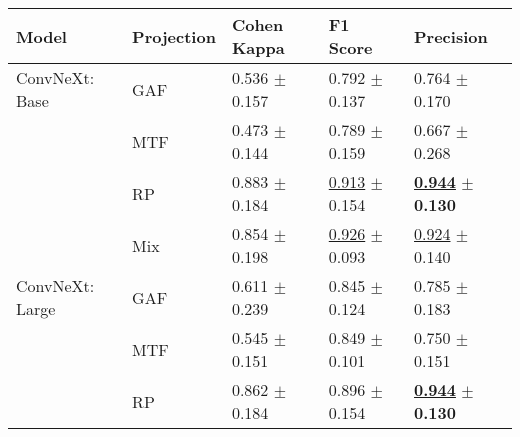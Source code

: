 
\begin{tabular}[t]{lllll}
\toprule
Model & Projection & Cohen Kappa & F1 Score & Precision \\
\midrule
ConvNeXt: Base & GAF & \textcolor[rgb]{0.8501939719,0.1498060281,0}{0.536} $\pm$ \textcolor[rgb]{0.4498340830,0.5000000000,0}{0.157} & \textcolor[rgb]{0.9819518717,0.0180481283,0}{0.792} $\pm$ \textcolor[rgb]{0.6916472560,0.3083527440,0}{0.137} & \textcolor[rgb]{0.6500000000,0.3500000000,0}{0.764} $\pm$ \textcolor[rgb]{0.2890812278,0.5000000000,0}{0.170} \\
 & MTF & \textcolor[rgb]{1.0000000000,0.0000000000,0}{0.473} $\pm$ \textcolor[rgb]{0.3758318907,0.5000000000,0}{0.144} & \textcolor[rgb]{1.0000000000,0.0000000000,0}{0.789} $\pm$ \textcolor[rgb]{1.0000000000,0.0000000000,0}{0.159} & \textcolor[rgb]{1.0000000000,0.0000000000,0}{0.667} $\pm$ \textcolor[rgb]{1.0000000000,0.0000000000,0}{0.268} \\
 & RP & \textcolor[rgb]{0.0295434199,0.5000000000,0}{0.883} $\pm$ \textcolor[rgb]{0.5955244630,0.4044755370,0}{0.184} & \underline{\textcolor[rgb]{0.2319518717,0.5000000000,0}{0.913}} $\pm$ \textcolor[rgb]{0.9235235198,0.0764764802,0}{0.154} & \underline{\textbf{\textcolor[rgb]{0.0000000000,0.5000000000,0}{0.944}}} $\pm$ \textbf{\textcolor[rgb]{0.0000000000,0.5000000000,0}{0.130}} \\
 & Mix & \textcolor[rgb]{0.0984780662,0.5000000000,0}{0.854} $\pm$ \textcolor[rgb]{0.6747481909,0.3252518091,0}{0.198} & \underline{\textcolor[rgb]{0.1510695187,0.5000000000,0}{0.926}} $\pm$ \textcolor[rgb]{0.0999682822,0.5000000000,0}{0.093} & \underline{\textcolor[rgb]{0.0750000000,0.5000000000,0}{0.924}} $\pm$ \textcolor[rgb]{0.0718829596,0.5000000000,0}{0.140} \\
ConvNeXt: Large & GAF & \textcolor[rgb]{0.6729334527,0.3270665473,0}{0.611} $\pm$ \textcolor[rgb]{0.8999515496,0.1000484504,0}{0.239} & \textcolor[rgb]{0.6510695187,0.3489304813,0}{0.845} $\pm$ \textcolor[rgb]{0.5159088943,0.4840911057,0}{0.124} & \textcolor[rgb]{0.5750000000,0.4250000000,0}{0.785} $\pm$ \textcolor[rgb]{0.3827984820,0.5000000000,0}{0.183} \\
 & MTF & \textcolor[rgb]{0.8281110116,0.1718889884,0}{0.545} $\pm$ \textcolor[rgb]{0.4139672114,0.5000000000,0}{0.151} & \textcolor[rgb]{0.6265597148,0.3734402852,0}{0.849} $\pm$ \textcolor[rgb]{0.2093230731,0.5000000000,0}{0.101} & \textcolor[rgb]{0.7000000000,0.3000000000,0}{0.750} $\pm$ \textcolor[rgb]{0.1516428390,0.5000000000,0}{0.151} \\
 & RP & \textcolor[rgb]{0.0787824530,0.5000000000,0}{0.862} $\pm$ \textcolor[rgb]{0.5941088240,0.4058911760,0}{0.184} & \textcolor[rgb]{0.3348930481,0.5000000000,0}{0.896} $\pm$ \textcolor[rgb]{0.9311751943,0.0688248057,0}{0.154} & \underline{\textbf{\textcolor[rgb]{0.0000000000,0.5000000000,0}{0.944}}} $\pm$ \textbf{\textcolor[rgb]{0.0000000000,0.5000000000,0}{0.130}} \\

\end{tabular}
